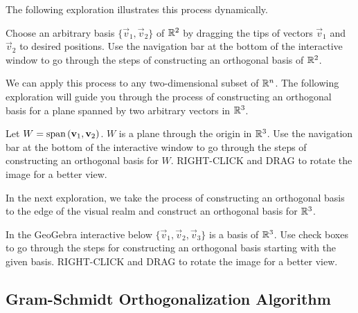 \documentclass{ximera}
\begin{document}
The following exploration illustrates this process dynamically.
\begin{exploration}\label{exp:orth1}
Choose an arbitrary basis $\{\vec{v}_1, \vec{v}_2\}$ of $\mathbb{R}^2$ by dragging the tips of vectors $\vec{v}_1$ and $\vec{v}_2$ to desired positions.  Use the navigation bar at the bottom of the interactive window to go through the steps of constructing an orthogonal basis of $\mathbb{R}^2$.
\begin{center}
\end{center}
\end{exploration}

We can apply this process to any two-dimensional subset of $\mathbb{R}^n$.  The following exploration will guide you through the process of constructing an orthogonal basis for a plane spanned by two arbitrary vectors in $\mathbb{R}^3$.
\begin{exploration}\label{exp:orth2}
Let $W =\mbox{span}\left({\bf v}_1,{\bf v}_2\right)$. $W$ is a plane through the origin in $\mathbb{R}^3$.  Use the navigation bar at the bottom of the interactive window to go through the steps of constructing an orthogonal basis for $W$.  RIGHT-CLICK and DRAG to rotate the image for a better view.
    \begin{center}
\end{center}
\end{exploration}

In the next exploration, we take the process of constructing an orthogonal basis to the edge of the visual realm and construct an orthogonal basis for $\mathbb{R}^3$.
\begin{exploration}\label{exp:orth3}
In the GeoGebra interactive below $\{\vec{v}_1, \vec{v}_2, \vec{v}_3\}$ is a basis of $\mathbb{R}^3$.  Use check boxes to go through the steps for constructing an orthogonal basis starting with the given basis.  RIGHT-CLICK and DRAG to rotate the image for a better view.
\begin{center}
\end{center}
\end{exploration}







\subsection*{Gram-Schmidt Orthogonalization Algorithm}
\end{document}
